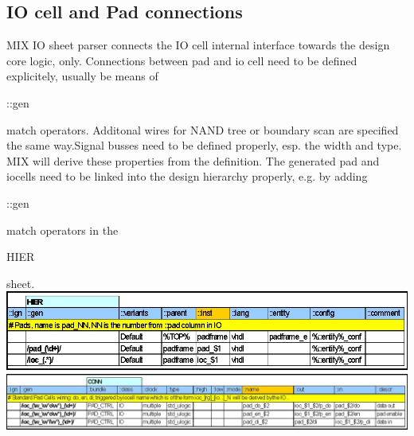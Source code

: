 \documentclass[a4paper,12pt]{article}
\begin{document}
\subsection{IO cell and Pad connections}
MIX IO sheet parser connects the IO cell internal interface towards the design core logic, only. Connections between pad and io cell need to be defined explicitely, usually be means of \begin{tt}::gen\end{tt} match operators.\newline
Additonal wires for NAND tree or boundary scan are specified the same way.Signal busses need to be defined properly, esp. the width and type. MIX will derive these properties from the definition.\newline
The generated pad and iocells need to be linked into the design hierarchy properly, e.g. by adding \begin{tt}::gen\end{tt} match operators in the \begin{tt}HIER\end{tt} sheet.\\
\includegraphics[scale=0.40]{images/mix_hier_sheet.jpg}\\
\includegraphics[scale=0.45]{images/mix_conn_sheet.jpg}
\end{document}
